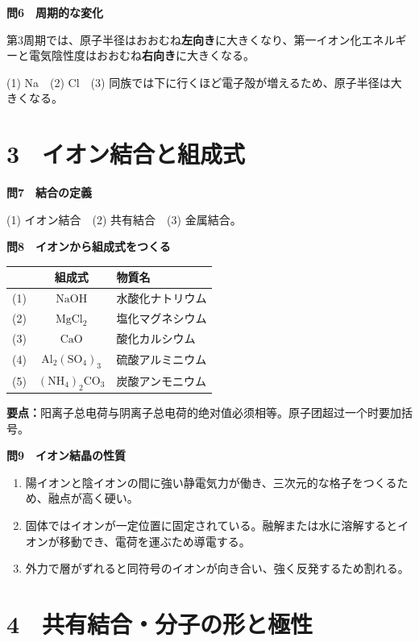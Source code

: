 \documentclass[11pt,a4paper]{ctexart}
\newcommand{\qtitle}[2]{\vspace{2mm}\noindent\textcolor{JapanBlue}{\textbf{問#1　#2}}\par}
\newcommand{\point}[1]{\textcolor{ChinaRed}{\textbf{要点：}}#1}
\begin{document}
\qtitle{6}{周期的な変化}
第3周期では、原子半径はおおむね\textbf{左向き}に大きくなり、第一イオン化エネルギーと電気陰性度はおおむね\textbf{右向き}に大きくなる。

(1) Na　(2) Cl　(3) 同族では下に行くほど電子殻が増えるため、原子半径は大きくなる。

\section*{3　イオン結合と組成式}

\qtitle{7}{結合の定義}
(1) イオン結合　(2) 共有結合　(3) 金属結合。

\qtitle{8}{イオンから組成式をつくる}
\begin{center}
\renewcommand{\arraystretch}{1.35}
\begin{tabular}{c|c|l}
\toprule
 & 組成式 & 物質名\\ \midrule
(1)& $\mathrm{NaOH}$ & 水酸化ナトリウム\\
(2)& $\mathrm{MgCl_2}$ & 塩化マグネシウム\\
(3)& $\mathrm{CaO}$ & 酸化カルシウム\\
(4)& $\mathrm{Al_2(SO_4)_3}$ & 硫酸アルミニウム\\
(5)& $\mathrm{(NH_4)_2CO_3}$ & 炭酸アンモニウム\\
\bottomrule
\end{tabular}
\end{center}
\point{阳离子总电荷与阴离子总电荷的绝对值必须相等。原子团超过一个时要加括号。}

\qtitle{9}{イオン結晶の性質}
\begin{enumerate}[label=(\arabic*),leftmargin=9mm]
\item 陽イオンと陰イオンの間に強い静電気力が働き、三次元的な格子をつくるため、融点が高く硬い。
\item 固体ではイオンが一定位置に固定されている。融解または水に溶解するとイオンが移動でき、電荷を運ぶため導電する。
\item 外力で層がずれると同符号のイオンが向き合い、強く反発するため割れる。
\end{enumerate}

\clearpage
\section*{4　共有結合・分子の形と極性}
\end{document}
